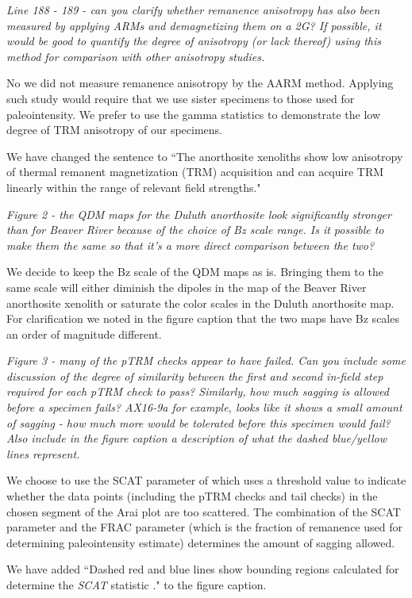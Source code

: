 \documentclass[11pt, letterpaper]{article}
\begin{document}
\begin{flushleft}
\textit{Line 188 - 189 - can you clarify whether remanence anisotropy has also been measured by applying ARMs and demagnetizing them on a 2G? If possible, it would be good to quantify the degree of anisotropy (or lack thereof) using this method for comparison with other anisotropy studies.}

No we did not measure remanence anisotropy by the AARM method. Applying such study would require that we use sister specimens to those used for paleointensity. We prefer to use the gamma statistics to demonstrate the low degree of TRM anisotropy of our specimens. 

We have changed the sentence to ``The anorthosite xenoliths show low anisotropy of thermal remanent magnetization (TRM) acquisition and can acquire TRM linearly within the range of relevant field strengths."

\textit{Figure 2 - the QDM maps for the Duluth anorthosite look significantly stronger than for Beaver River because of the choice of Bz scale range. Is it possible to make them the same so that it's a more direct comparison between the two?}

We decide to keep the Bz scale of the QDM maps as is. Bringing them to the same scale will either diminish the dipoles in the map of the Beaver River anorthosite xenolith or saturate the color scales in the Duluth anorthosite map. For clarification we noted in the figure caption that the two maps have Bz scales an order of magnitude different.

\textit{Figure 3 - many of the pTRM checks appear to have failed. Can you include some discussion of the degree of similarity between the first and second in-field step required for each pTRM check to pass? Similarly, how much sagging is allowed before a specimen fails? AX16-9a for example, looks like it shows a small amount of sagging - how much more would be tolerated before this specimen would fail? Also include in the figure caption a description of what the dashed blue/yellow lines represent.}

We choose to use the SCAT parameter of \cite{Tauxe2004a} which uses a threshold value to indicate whether the data points (including the pTRM checks and tail checks) in the chosen segment of the Arai plot are too scattered. The combination of the SCAT parameter and the FRAC parameter (which is the fraction of remanence used for determining paleointensity estimate) determines the amount of sagging allowed.

We have added ``Dashed red and blue lines show bounding regions calculated for determine the \textit{SCAT} statistic \cite{Shaar2013a}." to the figure caption.



\end{flushleft}
\end{document}
